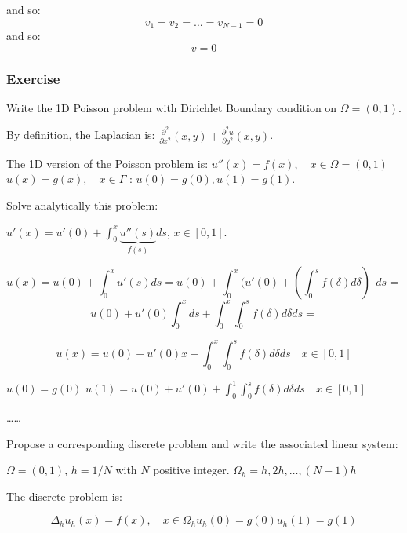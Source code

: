 and so:
\begin{equation*}
v_1 = v_2 = \dots = v_{N-1} = 0
\end{equation*}
and so:
\begin{equation*}
v = 0
\end{equation*}

\subsubsection*{Exercise}

Write the 1D Poisson problem with Dirichlet Boundary condition on $\Omega = (0, 1)$.

By definition, the Laplacian is: $\frac{\partial^2}{\partial x^2} (x,y) + \frac{\partial^2 u}{\partial y^2} (x,y)$.

The 1D version of the Poisson problem is: $u''(x) = f(x), \quad x \in \Omega = (0,1)$
$u(x) = g(x), \quad x \in \Gamma$ : $u(0) = g(0), u(1) = g(1)$.


Solve analytically this problem:

$u'(x) = u'(0) + \int_{0}^{x} \underbrace{u''(s)}_{f(s)} ds$, \quad $x \in [0, 1]$.

\begin{equation*}
u(x) = u(0) + \int_{0}^{x} u'(s) ds = u(0) + \int_{0}^{x} (u'(0) + (\int_{0}^{s} f(\delta) d\delta) \;\, ds = 
\end{equation*}
\begin{equation*}
u(0) + u'(0) \int_{0}^{x} ds + \int_{0}^{x} \int_{0}^{s} f(\delta) d\delta ds = 
\end{equation*}

\begin{equation*}
u(x) = u(0) + u'(0) x + \int_{0}^{x} \int_{0}^{s} f(\delta) d\delta ds \quad x \in [0, 1]
\end{equation*}

$u(0) = g(0)$
$u(1) = u(0) + u'(0) + \int_{0}^{1} \int_{0}^{s} f(\delta) d\delta ds \quad x \in [0, 1]$

\dots\dots


Propose a corresponding discrete problem and write the associated linear system:

$\Omega = (0, 1)$, $h = 1/N$ with $N$ positive integer.
$\Omega_h = {h, 2h, \dots, (N-1) h}$

The discrete problem is:

\begin{equation*}
\Delta_h u_h (x) = f(x), \quad x \in \Omega_h
u_h (0) = g(0)
u_h (1) = g(1)
\end{equation*}

